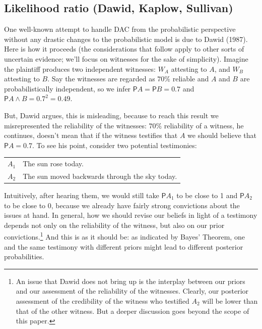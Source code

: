 \documentclass[10pt,dvipsnames,enabledeprecatedfontcommands]{scrartcl}
\newcommand{\et}{\wedge}
\newcommand{\pr}{\mathsf{P}}
\begin{document}
\subsection{Likelihood ratio (Dawid, Kaplow,
Sullivan)}\label{likelihood-ratio-dawid-kaplow-sullivan}


One well-known attempt to handle DAC from the probabilistic perspective
without any drastic changes to the probabilistic model is due to Dawid
(1987). Here is how it proceeds (the considerations that follow apply to
other sorts of uncertain evidence; we'll focus on witnesses for the sake
of simplicity). Imagine the plaintiff produces two independent
witnesses: \(W_A\) attesting to \(A\), and \(W_B\) attesting to \(B\).
Say the witnesses are regarded as \(70\%\) reliable and \(A\) and \(B\)
are probabilistically independent, so we infer \(\pr{A}=\pr{B}=0.7\) and
\(\pr{A\et B}=0.7^2=0.49\).

But, Dawid argues, this is misleading, because to reach this result we
misrepresented the reliability of the witnesses: \(70\%\) reliability of
a witness, he continues, doesn't mean that if the witness testifies that
\(A\) we should believe that \(\pr{A}=0.7\). To see his point, consider
two potential testimonies:

\begin{center}
\begin{tabular}
{@{}ll@{}}
\toprule
  $A_1$ & The sun rose today. \\
   $A_2$ & The sun moved backwards through the sky today.\\
\bottomrule
\end{tabular}
\end{center}

\noindent     Intuitively, after hearing them, we would still take
\(\pr{A_1}\) to be close to 1 and \(\pr{A_2}\) to be close to 0, because
we already have fairly strong convictions about the issues at hand. In
general, how we should revise our beliefs in light of a testimony
depends not only on the reliability of the witness, but also on our
prior
convictions.\footnote{An issue that Dawid does not bring up is the interplay between our priors and our assessment of the reliability of the witnesses. Clearly, our posterior assessment of the credibility of the witness who testified $A_2$ will be lower than that of the other witness. But a deeper discussion goes beyond the scope of this paper.}
And this is as it should be: as indicated by Bayes' Theorem, one and the
same testimony with different priors might lead to different posterior
probabilities.
\end{document}
